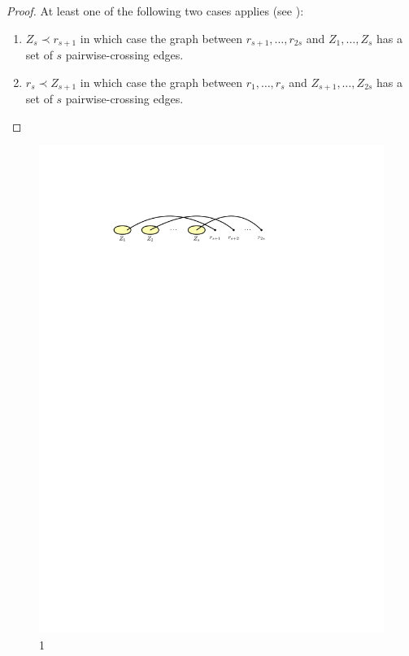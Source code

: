 \documentclass[kpfonts]{patmorin}
\begin{document}
\begin{proof}
    At least one of the following two cases applies (see ):
    \begin{enumerate}
        \item $Z_s\prec r_{s+1}$ in which case the graph between $r_{s+1},\ldots,r_{2s}$ and $Z_1,\ldots,Z_s$ has a set of $s$ pairwise-crossing edges.
        \item $r_{s}\prec Z_{s+1}$ in which case the graph between $r_1,\ldots,r_s$ and $Z_{s+1},\ldots,Z_{2s}$ has a set of $s$ pairwise-crossing edges. \qedhere
    \end{enumerate}
\end{proof}
\begin{figure}
	\begin{center}
		\includegraphics{figs/median-1} \\ 1 \\[2em]

\end{center}
\end{figure}
\end{document}
